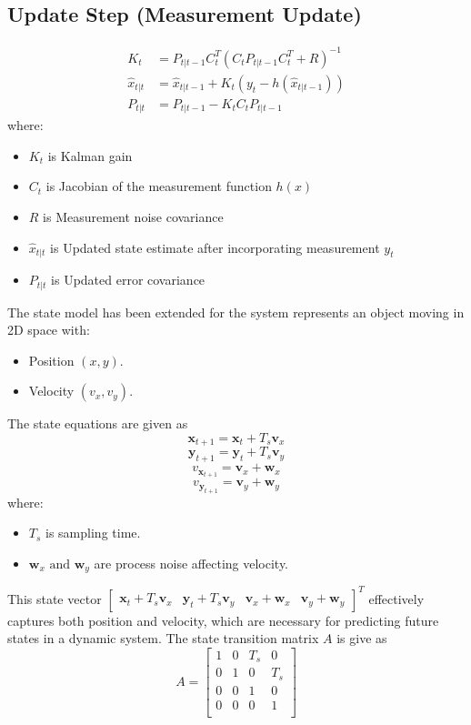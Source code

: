 \documentclass{article}
\begin{document}
\subsection*{Update Step (Measurement Update)}
\begin{align*}
K_t &= P_{t|t-1} C_t^T (C_t P_{t|t-1} C_t^T + R)^{-1} \\
\hat{x}_{t|t} &= \hat{x}_{t|t-1} + K_t \left( y_t - h(\hat{x}_{t|t-1}) \right) \\
P_{t|t} &= P_{t|t-1} - K_t C_t P_{t|t-1}
\end{align*}
where:
\begin{itemize}
    \item \( K_t \) is Kalman gain
    \item \( C_t \) is Jacobian of the measurement function \( h(x) \)
    \item \( R \) is Measurement noise covariance
    \item \( \hat{x}_{t|t} \) is Updated state estimate after incorporating measurement \( y_t \)
    \item \( P_{t|t} \) is Updated error covariance
\end{itemize}
The state model has been extended for the system represents an object moving in 2D space with:
\begin{itemize}
    \item Position \( (x,y) \).
    \item Velocity \( (v_x,v_y) \).
\end{itemize}
The state equations are given as
\[\mathbf{x}_{t+1} = \mathbf{x}_t + T_s \mathbf{v}_{x}\]
\[\mathbf{y}_{t+1} = \mathbf{y}_t + T_s \mathbf{v}_{y}\]
\[v_{\mathbf{x}_{t+1}} = \mathbf{v}_x + \mathbf{w}_{x}\]
\[v_{\mathbf{y}_{t+1}} = \mathbf{v}_y + \mathbf{w}_{y}\]
where:
\begin{itemize}
    \item \(T_s\) is sampling time.
    \item \(\mathbf{w}_{x} \text{ and } \mathbf{w}_{y}\) are process noise affecting velocity.
\end{itemize}
This state vector \(\begin{bmatrix}
    \mathbf{x}_t + T_s \mathbf{v}_{x} & \mathbf{y}_t + T_s \mathbf{v}_{y}
& \mathbf{v}_x + \mathbf{w}_{x}
& \mathbf{v}_y + \mathbf{w}_{y}
\end{bmatrix}^T\) effectively captures both position and velocity, which are necessary for predicting future states in a dynamic system. The state transition matrix \(A\) is give as
\[A = \begin{bmatrix}
    1 & 0 & T_s & 0 \\ 
    0 & 1 & 0 & T_s \\
    0 & 0 & 1 & 0 \\
    0 & 0 & 0 & 1 \\ \end{bmatrix}\]
\end{document}
